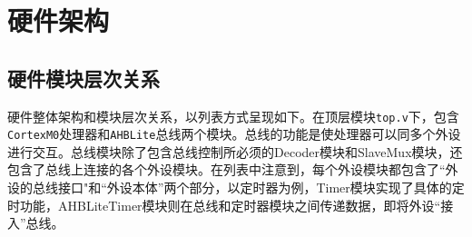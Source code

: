 \section{硬件架构}

\subsection{硬件模块层次关系}
硬件整体架构和模块层次关系，以列表方式呈现如下。在顶层模块\texttt{top.v}下，包含\texttt{CortexM0}处理器和\texttt{AHBLite}总线两个模块。总线的功能是使处理器可以同多个外设进行交互。总线模块除了包含总线控制所必须的Decoder模块和SlaveMux模块，还包含了总线上连接的各个外设模块。在列表中注意到，每个外设模块都包含了“外设的总线接口"和“外设本体”两个部分，以定时器为例，Timer模块实现了具体的定时功能，AHBLiteTimer模块则在总线和定时器模块之间传递数据，即将外设“接入”总线。
